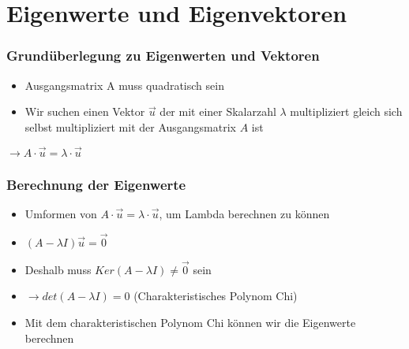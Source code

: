 \section{Eigenwerte und Eigenvektoren}


\begin{frame}
    \frametitle{Grundüberlegung zu Eigenwerten und Vektoren}
    \begin{itemize}
        \item Ausgangsmatrix A muss quadratisch sein
        \item Wir suchen einen Vektor $\vec{u}$ der mit einer Skalarzahl $\lambda$ multipliziert gleich sich selbst multipliziert mit der Ausgangsmatrix $A$ ist
    \end{itemize}
    $\rightarrow A \cdot \vec{u} = \lambda \cdot \vec{u}$
\end{frame}
\begin{frame}
    \frametitle{Berechnung der Eigenwerte}
    \begin{itemize}
        \item Umformen von $A \cdot \vec{u} = \lambda \cdot \vec{u}$, um Lambda berechnen zu können
        \item $(A- \lambda I)\vec{u} = \vec{0}$
        \item Deshalb muss $Ker(A - \lambda I) \neq \vec{0}$ sein
        \item $\rightarrow det(A - \lambda I) = 0$ (Charakteristisches Polynom Chi)
        \item Mit dem charakteristischen Polynom Chi können wir die Eigenwerte berechnen
    \end{itemize}
\end{frame}
